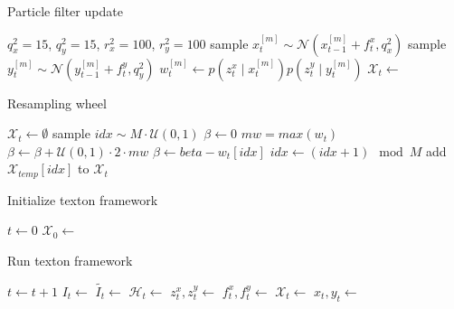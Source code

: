 \begin{algorithm}
\caption{{Particle filter update}}
\label{alg:particle_filter}
\begin{algorithmic}[1]
  \State $q_x^2 = 15$, $q_y^2 = 15$, $r_x^2 = 100$, $r_y^2 = 100$
  \State sample $x_t^{[m]} \sim \mathcal{N}(x_{t-1}^{[m]} + f_t^x, q_x^2)$
  \State sample $y_t^{[m]} \sim \mathcal{N}(y_{t-1}^{[m]} + f_t^y, q_y^2)$
  \State $w_t^{[m]} \gets p(z_t^x \mid x_t^{[m]}) p(z_t^y \mid y_t^{[m]})$
  \EndFor
  \State $\mathcal{X}_t \gets$ 
  \EndProcedure
\end{algorithmic}
\end{algorithm}

\begin{algorithm}
\caption{{Resampling wheel}}
\label{alg:resampling_wheel}
  \begin{algorithmic}[1]
    \State $\mathcal{X}_t \gets \emptyset$
    \State sample $idx \sim M\cdot\mathcal{U}(0, 1)$
    \State $\beta \gets 0$
    \State $mw = max(w_t)$
    \State $\beta \gets \beta + \mathcal{U}(0, 1)\cdot 2\cdot mw$
    \State $\beta \gets beta - w_t[idx]$
    \State $idx \gets (idx + 1) \mod M$
    \EndWhile
    \State add $\mathcal{X}_{temp}[idx]$ to $\mathcal{X}_t$
    \EndFor
\EndProcedure
  \end{algorithmic}
\end{algorithm}

\begin{algorithm}
\caption{{Initialize texton framework}}
\label{alg:trexton_init}
  \begin{algorithmic}[1]
    \State $t \gets 0$ 
    \State $\mathcal{X}_0 \gets$ 
    \EndProcedure
  \end{algorithmic}
\end{algorithm}

\begin{algorithm}
\caption{{Run texton framework}}
\label{alg:trexton_run}
  \begin{algorithmic}[1]
    \State $t \gets t+1$ 
    \State $I_t \gets$ 
    \State $\widetilde{I_t} \gets$ 
    \State $\mathcal{H}_t \gets$ 
    \State $z_t^x, z_t^y \gets$ 
    \State $f_t^x, f_t^y \gets$ 
    \State $\mathcal{X}_t \gets$
    \State $x_t, y_t \gets$ 
    \State {}
    \EndProcedure
  \end{algorithmic}
\end{algorithm}